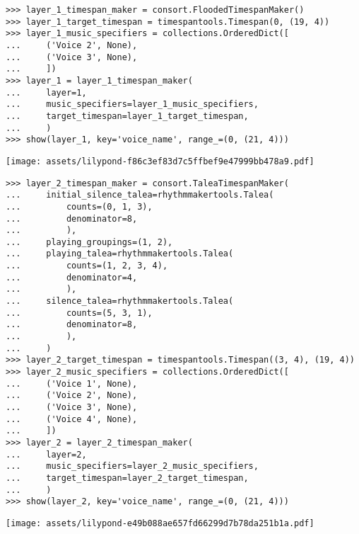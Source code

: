 \begin{singlespacing}
\vspace{-0.5\baselineskip}
\begin{lstlisting}
>>> layer_1_timespan_maker = consort.FloodedTimespanMaker()
>>> layer_1_target_timespan = timespantools.Timespan(0, (19, 4))
>>> layer_1_music_specifiers = collections.OrderedDict([
...     ('Voice 2', None),
...     ('Voice 3', None),
...     ])
>>> layer_1 = layer_1_timespan_maker(
...     layer=1,
...     music_specifiers=layer_1_music_specifiers,
...     target_timespan=layer_1_target_timespan,
...     )
>>> show(layer_1, key='voice_name', range_=(0, (21, 4)))
\end{lstlisting}
\noindent\texttt{[image: assets/lilypond-f86c3ef83d7c5ffbef9e47999bb478a9.pdf]}
\end{singlespacing}

\begin{comment}
<abjad>
layer_2_timespan_maker = consort.TaleaTimespanMaker(
    initial_silence_talea=rhythmmakertools.Talea(
        counts=(0, 1, 3),
        denominator=8,
        ),
    playing_groupings=(1, 2),
    playing_talea=rhythmmakertools.Talea(
        counts=(1, 2, 3, 4),
        denominator=4,
        ),
    silence_talea=rhythmmakertools.Talea(
        counts=(5, 3, 1),
        denominator=8,
        ),
    )
layer_2_target_timespan = timespantools.Timespan((3, 4), (19, 4))
layer_2_music_specifiers = collections.OrderedDict([
    ('Voice 1', None),
    ('Voice 2', None),
    ('Voice 3', None),
    ('Voice 4', None),
    ])
layer_2 = layer_2_timespan_maker(
    layer=2,
    music_specifiers=layer_2_music_specifiers,
    target_timespan=layer_2_target_timespan,
    )
show(layer_2, key='voice_name', range_=(0, (21, 4)))
</abjad>
\end{comment}

\begin{singlespacing}
\vspace{-0.5\baselineskip}
\begin{lstlisting}
>>> layer_2_timespan_maker = consort.TaleaTimespanMaker(
...     initial_silence_talea=rhythmmakertools.Talea(
...         counts=(0, 1, 3),
...         denominator=8,
...         ),
...     playing_groupings=(1, 2),
...     playing_talea=rhythmmakertools.Talea(
...         counts=(1, 2, 3, 4),
...         denominator=4,
...         ),
...     silence_talea=rhythmmakertools.Talea(
...         counts=(5, 3, 1),
...         denominator=8,
...         ),
...     )
>>> layer_2_target_timespan = timespantools.Timespan((3, 4), (19, 4))
>>> layer_2_music_specifiers = collections.OrderedDict([
...     ('Voice 1', None),
...     ('Voice 2', None),
...     ('Voice 3', None),
...     ('Voice 4', None),
...     ])
>>> layer_2 = layer_2_timespan_maker(
...     layer=2,
...     music_specifiers=layer_2_music_specifiers,
...     target_timespan=layer_2_target_timespan,
...     )
>>> show(layer_2, key='voice_name', range_=(0, (21, 4)))
\end{lstlisting}
\noindent\texttt{[image: assets/lilypond-e49b088ae657fd66299d7b78da251b1a.pdf]}
\end{singlespacing}

